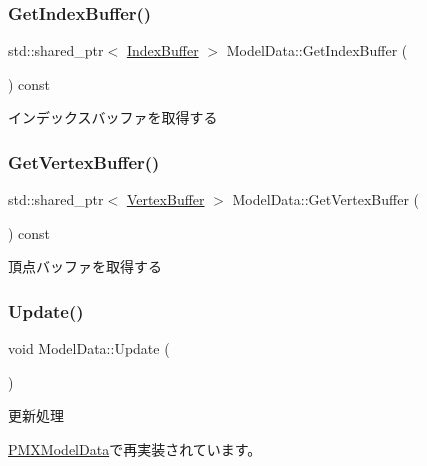 \subsubsection{\texorpdfstring{Get\+Index\+Buffer()}{GetIndexBuffer()}}
{\footnotesize\ttfamily std\+::shared\+\_\+ptr$<$ \mbox{\hyperlink{class_index_buffer}{Index\+Buffer}} $>$ Model\+Data\+::\+Get\+Index\+Buffer (\begin{DoxyParamCaption}{ }\end{DoxyParamCaption}) const}



インデックスバッファを取得する 

\mbox{\label{class_model_data_a4c76f184b373d682cd94a21440730ac0}} 
\subsubsection{\texorpdfstring{Get\+Vertex\+Buffer()}{GetVertexBuffer()}}
{\footnotesize\ttfamily std\+::shared\+\_\+ptr$<$ \mbox{\hyperlink{class_vertex_buffer}{Vertex\+Buffer}} $>$ Model\+Data\+::\+Get\+Vertex\+Buffer (\begin{DoxyParamCaption}{ }\end{DoxyParamCaption}) const}



頂点バッファを取得する 

\mbox{\label{class_model_data_a67a18789221798611c63fd18edb3a9fc}} 
\subsubsection{\texorpdfstring{Update()}{Update()}}
{\footnotesize\ttfamily void Model\+Data\+::\+Update (\begin{DoxyParamCaption}{ }\end{DoxyParamCaption})\hspace{0.3cm}{\ttfamily [virtual]}}



更新処理 



\mbox{\hyperlink{class_p_m_x_model_data_a4c692007e0b890ee0bfd0f2bbbe0b97f}{P\+M\+X\+Model\+Data}}で再実装されています。



